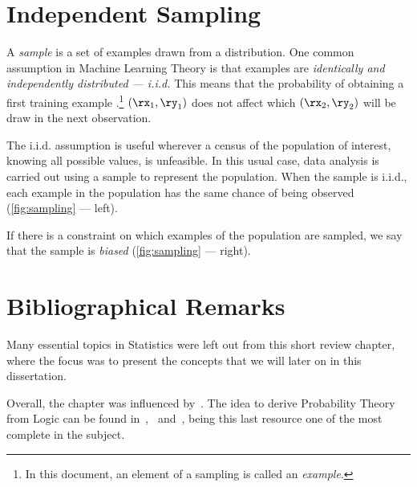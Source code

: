 \section{Independent Sampling}
  A \emph{sample} is a set of examples drawn from a distribution.
One common assumption in Machine Learning Theory is that examples are \emph{identically and independently distributed --- i.i.d.} This means that the probability of obtaining a first training example
.\footnote{In this document, an element of a sampling is called an \emph{example}. } \((\rx_1, \ry_1)\) does not affect which \((\rx_2, \ry_2)\) will be draw in the next observation.

The i.i.d. assumption is useful wherever a census of the population of interest, knowing all possible values, is unfeasible. In this usual case, data analysis is carried out using a sample to represent the population. When the sample is i.i.d., each example in the population has the same chance of being observed (\cref{fig:sampling} --- left).

If there is a constraint on which examples of the population are sampled, we say that the sample is \emph{biased} (\cref{fig:sampling} --- right).

\section{Bibliographical Remarks}
Many essential topics in Statistics were left out from this short review chapter, where the focus was to present the concepts that we will later on in this dissertation.

Overall, the chapter was influenced by~\citeauthor{wasserman:2013}. The idea to derive Probability Theory from Logic can be found in~\citeauthor{jaynes:2003},~\citeauthor{sowinski:2016} and~\citeauthor{caticha:2008}, being this last resource one of the most complete in the subject.



